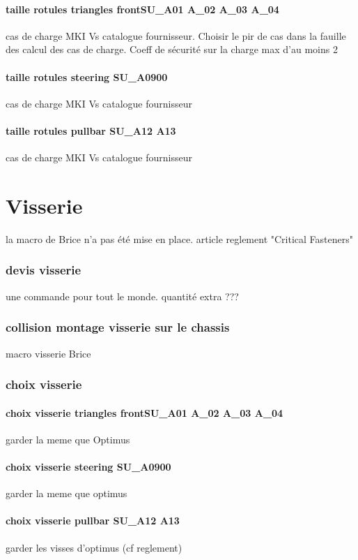 			\paragraph{taille rotules triangles frontSU\_A01 A\_02 A\_03 A\_04} cas de charge MKI Vs catalogue fournisseur. Choisir le pir de cas dans la fauille des calcul des cas de charge. Coeff de sécurité sur la charge max d'au moins 2
			\paragraph{taille rotules steering SU\_A0900} cas de charge MKI Vs catalogue fournisseur
			\paragraph{taille rotules pullbar SU\_A12 A13} cas de charge MKI Vs catalogue fournisseur
\newpage 
 \section*{Visserie} 
 \par la macro de Brice n'a pas été mise en place. article reglement "Critical Fasteners"
		\subsubsection*{devis visserie} 
 \par une commande pour tout le monde. quantité extra ???
		\subsubsection*{collision montage visserie sur le chassis} 
 \par macro visserie Brice
		\subsubsection*{choix visserie} 
 \par 
			\paragraph{choix visserie triangles frontSU\_A01 A\_02 A\_03 A\_04} garder la meme que Optimus
			\paragraph{choix visserie steering SU\_A0900} garder la meme que optimus
			\paragraph{choix visserie pullbar SU\_A12 A13} garder les visses d'optimus (cf reglement)
